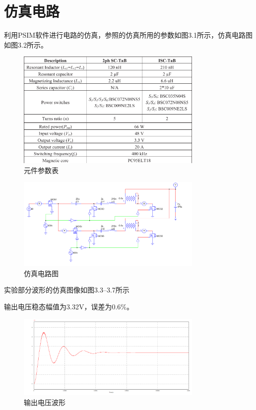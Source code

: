 \documentclass[12pt,a4paper]{report}
\begin{document}
\section{仿真电路}
利用PSIM软件进行电路的仿真，参照的仿真所用的参数如图3.1所示，仿真电路图如图3.2所示。
\begin{figure}[h]
    \centering
    \includegraphics[width = 0.8\textwidth]{figures/parameter_table figure.png}
    \caption{元件参数表}
\end{figure}
\begin{figure}[h]
    \centering
    \includegraphics[width = 0.8\textwidth]{figures/PSIM-circuit diagram1.png}
    \caption{仿真电路图}
\end{figure}

实验部分波形的仿真图像如图3.3--3.7所示

输出电压稳态幅值为3.32V，误差为$0.6\%$。

\begin{figure}[h]
    \centering
    \includegraphics[width = 0.8\textwidth]{figures/sim_v_out.png}
    \caption{输出电压波形}
\end{figure}
\end{document}
